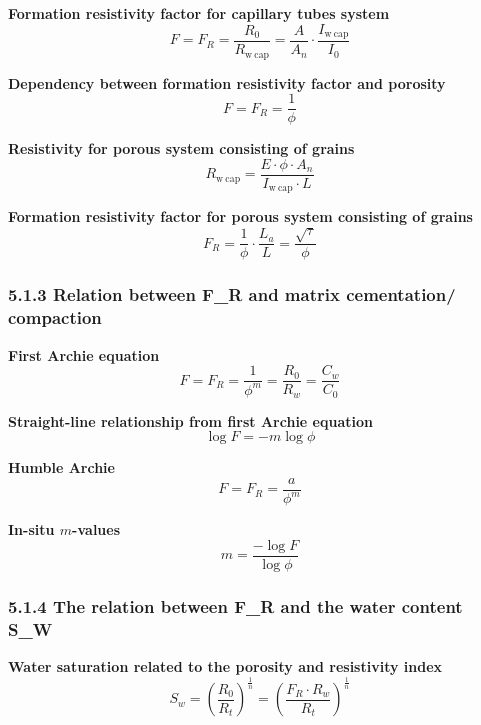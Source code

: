\textbf{Formation resistivity factor for capillary tubes system}
\begin{equation*}
    F = F_R = \frac{R_0}{R_\mathrm{w\ cap}} = \frac{A}{A_n}\cdot\frac{I_\mathrm{w\ cap}}{I_0}\tag{5.6}
\end{equation*}

\textbf{Dependency between formation resistivity factor and porosity}
\begin{equation*}
    F = F_R = \frac{1}{\phi}\tag{5.7}
\end{equation*}

\textbf{Resistivity for porous system consisting of grains}
\begin{equation*}
    R_\mathrm{w\ cap} = \frac{E\cdot\phi\cdot A_n}{I_\mathrm{w\ cap}\cdot L}\tag{5.8}
\end{equation*}

\textbf{Formation resistivity factor for porous system consisting of grains}
\begin{equation*}
    F_R = \frac{1}{\phi}\cdot\frac{L_a}{L} = \frac{\sqrt{\tau}}{\phi}\tag{5.9}
\end{equation*}

\subsubsection{5.1.3 Relation between F\_R and matrix cementation/ compaction}
\textbf{First Archie equation}
\begin{equation*}
    F = F_R = \frac{1}{\phi^m}=\frac{R_0}{R_w}=\frac{C_w}{C_0}\tag{5.10}
\end{equation*}

\textbf{Straight-line relationship from first Archie equation}
\begin{equation*}
    \log F = -m\log\phi\tag{5.11}
\end{equation*}

\textbf{Humble Archie}
\begin{equation*}
    F = F_R = \frac{a}{\phi^m}\tag{5.12}
\end{equation*}

\textbf{In-situ $m$-values}
\begin{equation*}
    m = \frac{-\log F}{\log\phi}\tag{5.13}
\end{equation*}

\subsubsection{5.1.4 The relation between F\_R and the water content S\_W}
\textbf{Water saturation related to the porosity and resistivity index}
\begin{equation*}
    S_w = \left( \frac{R_0}{R_t} \right)^\frac{1}{n} = \left( \frac{F_R\cdot R_w}{R_t} \right)^\frac{1}{n}\tag{5.14}
\end{equation*}

